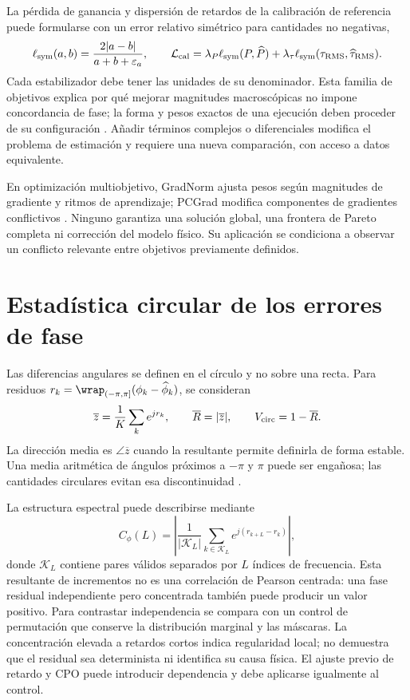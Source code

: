 La pérdida de ganancia y dispersión de retardos de la calibración de referencia puede
formularse con un error relativo simétrico para cantidades no negativas,
\begin{equation}
\ell_{\rm sym}(a,b)=\frac{2|a-b|}{a+b+\varepsilon_a},\qquad
\mathcal L_{\rm cal}=\lambda_P\ell_{\rm sym}(P,\widehat P)
+\lambda_\tau\ell_{\rm sym}(\tau_{\rm RMS},\widehat\tau_{\rm RMS}).
\label{eq:calibration_macro_loss}
\end{equation}
Cada estabilizador debe tener las unidades de su denominador. Esta familia de objetivos
explica por qué mejorar magnitudes macroscópicas no impone concordancia de fase;
la forma y pesos exactos de una ejecución deben proceder de su configuración
\citep{Hoydis2024DiffRT}. Añadir términos complejos o diferenciales modifica el problema
de estimación y requiere una nueva comparación, con acceso a datos equivalente.

En optimización multiobjetivo, GradNorm ajusta pesos según magnitudes de gradiente y
ritmos de aprendizaje; PCGrad modifica componentes de gradientes conflictivos
\citep{Chen2018GradNorm,Yu2020PCGrad}. Ninguno garantiza una solución global, una
frontera de Pareto completa ni corrección del modelo físico. Su aplicación se condiciona
a observar un conflicto relevante entre objetivos previamente definidos.

\section{Estadística circular de los errores de fase}
\label{sec:circular_foundations}

Las diferencias angulares se definen en el círculo y no sobre una recta. Para residuos
$r_k=\wrap_{(-\pi,\pi]}(\phi_k-\widehat\phi_k)$, se consideran
\begin{equation}
\overline z=\frac{1}{K}\sum_k e^{jr_k},\qquad
\overline R=|\overline z|,\qquad V_{\rm circ}=1-\overline R.
\end{equation}
La dirección media es $\angle\overline z$ cuando la resultante permite definirla de
forma estable. Una media aritmética de ángulos próximos a $-\pi$ y $\pi$ puede ser
engañosa; las cantidades circulares evitan esa discontinuidad
\citep{Mardia2000Directional}.

La estructura espectral puede describirse mediante
\begin{equation}
C_\phi(L)=\left|\frac{1}{|\mathcal K_L|}
\sum_{k\in\mathcal K_L}e^{j(r_{k+L}-r_k)}\right|,
\label{eq:circular_lag}
\end{equation}
donde $\mathcal K_L$ contiene pares válidos separados por $L$ índices de frecuencia.
Esta resultante de incrementos no es una correlación de Pearson centrada: una fase
residual independiente pero concentrada también puede producir un valor positivo.
Para contrastar independencia se compara con un control de permutación que conserve
la distribución marginal y las máscaras. La concentración elevada a retardos cortos
indica regularidad local; no demuestra que el residual sea determinista ni identifica
su causa física. El ajuste previo de retardo y CPO puede introducir dependencia y
debe aplicarse igualmente al control.

